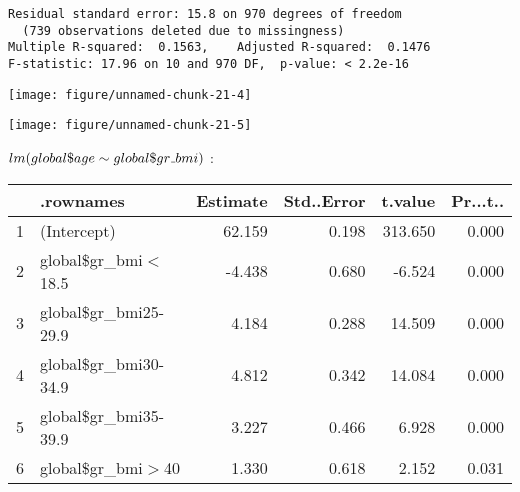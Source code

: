 \documentclass[11pt,a4paper]{article}\usepackage[]{graphicx}\usepackage[]{color}
\makeatletter
\def\maxwidth{ %
  \ifdim\Gin@nat@width>\linewidth
    \linewidth
  \else
    \Gin@nat@width
  \fi
}
\newenvironment{kframe}{%
 \def\at@end@of@kframe{}%
 \ifinner\ifhmode%
  \def\at@end@of@kframe{\end{minipage}}%
  \begin{minipage}{\columnwidth}%
 \fi\fi%
 \def\FrameCommand##1{\hskip\@totalleftmargin \hskip-\fboxsep
 \colorbox{shadecolor}{##1}\hskip-\fboxsep
     \hskip-\linewidth \hskip-\@totalleftmargin \hskip\columnwidth}%
 \MakeFramed {\advance\hsize-\width
   \@totalleftmargin\z@ \linewidth\hsize
   \@setminipage}}%
 {\par\unskip\endMakeFramed%
 \at@end@of@kframe}
\newenvironment{knitrout}{}{} %
\makeatother
\begin{document}
\begin{knitrout}
\begin{kframe}
\begin{verbatim}
Residual standard error: 15.8 on 970 degrees of freedom
  (739 observations deleted due to missingness)
Multiple R-squared:  0.1563,	Adjusted R-squared:  0.1476 
F-statistic: 17.96 on 10 and 970 DF,  p-value: < 2.2e-16
\end{verbatim}
\end{kframe}
\texttt{[image: figure/unnamed-chunk-21-4]} 

\texttt{[image: figure/unnamed-chunk-21-5]} 

\end{knitrout}

$lm(global\mathdollar age\sim global\mathdollar gr\mathunderscore bmi)$ :

\begin{table}[H]
\centering
\begin{tabular}{rlrrrr}
  \hline
 & .rownames & Estimate & Std..Error & t.value & Pr...t.. \\ 
  \hline
1 & (Intercept) & 62.159 & 0.198 & 313.650 & 0.000 \\ 
  2 & global\$gr\_bmi$<$18.5 & -4.438 & 0.680 & -6.524 & 0.000 \\ 
  3 & global\$gr\_bmi25-29.9 & 4.184 & 0.288 & 14.509 & 0.000 \\ 
  4 & global\$gr\_bmi30-34.9 & 4.812 & 0.342 & 14.084 & 0.000 \\ 
  5 & global\$gr\_bmi35-39.9 & 3.227 & 0.466 & 6.928 & 0.000 \\ 
  6 & global\$gr\_bmi$>$40 & 1.330 & 0.618 & 2.152 & 0.031 \\ 
   \hline
\end{tabular}
\end{table}
\end{document}
